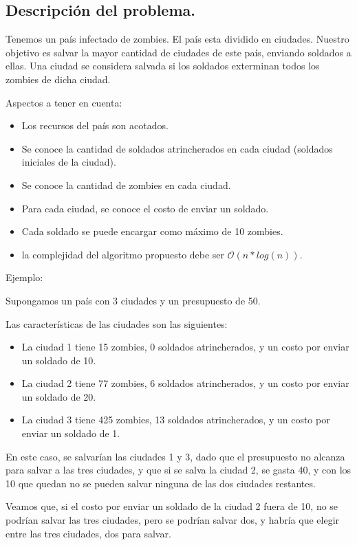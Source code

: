 \subsection{Descripción del problema.}

\vspace*{0.3cm}

Tenemos un país infectado de zombies. El país esta dividido en ciudades. Nuestro objetivo es salvar la mayor cantidad de ciudades de este país, enviando soldados a ellas. Una ciudad se considera salvada si los soldados exterminan todos los zombies de dicha ciudad.

Aspectos a tener en cuenta:

\begin{itemize}
   \item Los recursos del país son acotados.
   \item Se conoce la cantidad de soldados atrincherados en cada ciudad (soldados iniciales de la ciudad).
   \item Se conoce la cantidad de zombies en cada ciudad.
   \item Para cada ciudad, se conoce el costo de enviar un soldado.
   \item Cada soldado se puede encargar como máximo de 10 zombies.
   \item la complejidad del algoritmo propuesto debe ser $\mathcal{O}(n*log(n))$.
\end{itemize}

Ejemplo:

Supongamos un país con 3 ciudades y un presupuesto de 50.

Las características de las ciudades son las siguientes:
\begin{itemize}
	\item La ciudad 1 tiene 15 zombies, 0 soldados atrincherados, y un costo por enviar un soldado de 10.
	\item La ciudad 2 tiene 77 zombies, 6 soldados atrincherados, y un costo por enviar un soldado de 20.
	\item La ciudad 3 tiene 425 zombies, 13 soldados atrincherados, y un costo por enviar un soldado de 1.
\end{itemize}

En este caso, se salvarían las ciudades 1 y 3, dado que el presupuesto no alcanza para salvar a las tres ciudades, y que si se salva la ciudad 2, se gasta 40, y con los 10 que quedan no se pueden salvar ninguna de las dos ciudades restantes.

Veamos que, si el costo por enviar un soldado de la ciudad 2 fuera de 10, no se podrían salvar las tres ciudades, pero se podrían salvar dos, y habría que elegir entre las tres ciudades, dos para salvar.

